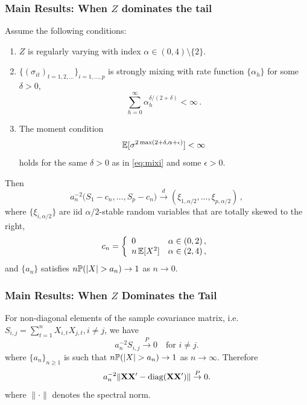 \documentclass{beamer}
\begin{document}
\begin{frame}
  \frametitle{Main Results: When $Z$ dominates the tail}
  \begin{scriptsize}
    \begin{theorem}
      Assume the following conditions:
      \begin{enumerate}
      \item
        $Z$ is regularly varying with index $\alpha\in (0,4) \setminus \{2\}$.
      \item
        $\{(\sigma_{it})_{t=1,2,\ldots}\}_{i=1,\ldots,p}$  is strongly
        mixing with rate function $\{\alpha_h\}$ for some $\delta>0$,
        \begin{equation}
          \label{eq:mixi}
          \sum_{h=0}^\infty \alpha_h^{\delta/(2+\delta)}<\infty\,.        
        \end{equation}
      \item
        The moment condition
        \begin{equation}
          \label{eq:moment}
          \E[\sigma^{2\max(2+\delta,\alpha+\epsilon)} ]<\infty        
        \end{equation}
        holds for the same $\delta>0$ as in \eqref{eq:mixi} and some $\epsilon>0$. 
      \end{enumerate}
      Then 
      \begin{equation}
        \label{eq:feller}
        a_n^{-2}\big(S_{1}-c_n,\ldots,S_{p}-c_n\big) \overset{d}{\to} (\xi_{1,\alpha/2},\ldots,\xi_{p,\alpha/2})\,,      
      \end{equation}
      where $\{\xi_{i,\alpha/2}\}$ are iid $\alpha/2$-stable random
      variables that are totally skewed to the right,
      \begin{equation}
        \label{eq:6:anja}
        c_n=\left\{\begin{array}{ll}
            0& \alpha \in (0,2)\,,\\
            n \,\E[X^2] &\alpha\in (2,4)\,,
          \end{array}
        \right.
      \end{equation}
      and $\{a_n\}$ satisfies $n \P(|X|>a_n)\to 1$ as $n \to 0$.
    \end{theorem}
  \end{scriptsize}
\end{frame}

\begin{frame}
  \frametitle{Main Results: When $Z$ Dominates the Tail}
  For non-diagonal elements of the sample covariance matrix, i.e.
  $S_{i,j} = \sum_{t=1}^n X_{i,t} X_{j,t}, i \neq j$, we have
  \[
  a_n^{-2} S_{i,j} \overset{P}{\to} 0
  \quad
  \text{for } i \neq j.
  \]
  where $\{a_n\}_{n\geq 1}$ is such that $n\P(|X| > a_n) \to 1$
  as $n \to \infty$. Therefore
  \begin{equation}
    a_n^{-2} \|\mtx{X X'} - \diag(\mtx{X X'}) \|
    \overset{P}{\to} 0.
  \end{equation}
  where $\|\cdot\|$ denotes the spectral norm.
\end{frame}
\end{document}
